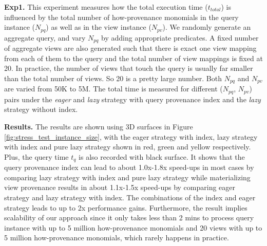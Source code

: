 \textbf{Exp1.}  This experiment measures how the total execution time ($t_{total}$) is influenced by the total number of how-provenance monomials in the query instance ($N_{pq}$) as well as 
in the view instance ($N_{pv}$). We randomly generate an aggregate query, and vary $N_{pq}$ by adding appropriate predicates. A fixed number of aggregate views are also generated such that there is exact one view mapping from each of them to the query and the total number of view mappings is fixed at 20.  In practice, the number of views that touch the query is usually far smaller than the total number of views. So 20 is a pretty large number. Both $N_{pq}$ and $N_{pv}$ are varied from 50K to 5M. The total time is measured for different ($N_{pq}$, $N_{pv}$) pairs under the {\em eager} and {\em lazy} strategy with query provenance index and the {\em lazy} strategy without index. 

\textbf{Results.} 
The results are shown using 3D surfaces in Figure \ref{fig:stress_test_instance_size}, with the eager strategy with index, lazy strategy with index and pure lazy strategy shown in red, green and yellow respectively. Plus, the query time $t_q$ is also recorded with black surface. It shows that the query provenance index can lead to about 1.0x-1.8x speed-ups in most cases by comparing lazy strategy with index and pure lazy strategy while materializing view provenance results in about 1.1x-1.5x speed-ups by comparing eager strategy and lazy strategy with index. The combinations of the index and eager strategy leads to up to 2x performance gains. Furthermore, the result implies scalability of our approach since it only takes less than 2 mins to process query instance with up to 5 million how-provenance monomials and 20 views with up to 5 million how-provenance monomials, which rarely happens in practice. 


